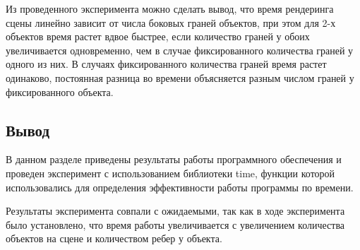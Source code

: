 Из проведенного эксперимента можно сделать вывод, что время рендеринга сцены линейно зависит от числа боковых граней объектов, при этом для 2-х объектов время растет вдвое быстрее, если количество граней у обоих увеличивается одновременно, чем в случае фиксированного количества граней у одного из них. В случаях фиксированного количества граней время растет одинаково, постоянная разница во времени объясняется разным числом граней у фиксированного объекта.

\subsection*{Вывод}
В данном разделе приведены результаты работы программного
обеспечения и проведен эксперимент с использованием библиотеки time,
функции которой использовались для определения эффективности работы
программы по времени.

Результаты эксперимента совпали с ожидаемыми, так как в ходе
эксперимента было установлено, что время работы увеличивается с увеличением
количества объектов на сцене и количеством ребер у объекта.